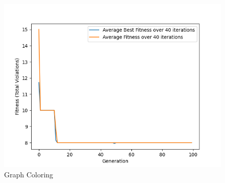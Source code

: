 \documentclass[11pt, letterpaper]{article}
\begin{document}
\begin{figure}[H]
  \includegraphics[width=\linewidth]{images/graphcoloring_rd_tr.png}
  \caption{Graph Coloring}
\endminipage
\end{figure}
\end{document}
